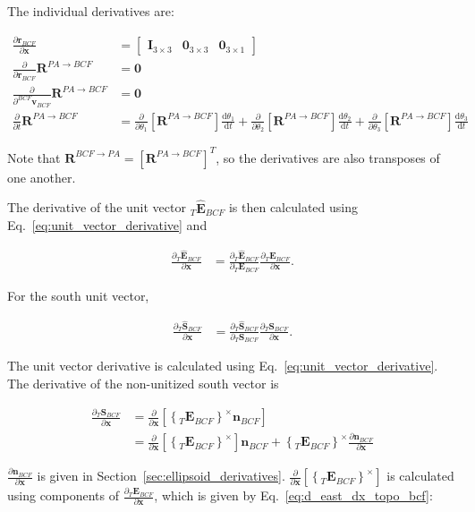 \documentclass[]{article}
\newcommand{\vb}[1]{\bm{#1}} %
\newcommand{\vbh}[1]{\hat{\bm{#1}}} %
\newcommand{\ddt}[1]{\frac{\mathrm{d} #1}{\mathrm{d} t}} %
\newcommand{\pd}[2]{\frac{\partial #1}{\partial #2}} %
\begin{document}
The individual derivatives are:

\begin{align}
	\pd{\vb{r}_{BCF}}{\vb{x}} &= \left[ \begin{array}{ccc} \vb{I}_{3 \times 3} & \vb{0}_{3 \times 3} & \vb{0}_{3 \times 1} \end{array} \right] \\
	\pd{}{\vb{r}_{BCF}} \vb{R}^{PA \rightarrow BCF} &= \vb{0} \\
	\pd{}{^{BCF} \vb{v}_{BCF}} \vb{R}^{PA \rightarrow BCF} &= \vb{0} \\
	\pd{}{t} \vb{R}^{PA \rightarrow BCF} &= \pd{}{\theta_1} \left[ \vb{R}^{PA \rightarrow BCF} \right] \ddt{\theta_1} + \pd{}{\theta_2} \left[ \vb{R}^{PA \rightarrow BCF} \right] \ddt{\theta_2} + \pd{}{\theta_3} \left[ \vb{R}^{PA \rightarrow BCF} \right] \ddt{\theta_3}
\end{align}

Note that $\vb{R}^{BCF \rightarrow PA} = \left[ \vb{R}^{PA \rightarrow BCF} \right]^T$, so the derivatives are also transposes of one another.

The derivative of the unit vector $_T \vbh{E}_{BCF}$ is then calculated using Eq.~\eqref{eq:unit_vector_derivative} and

\begin{align}
\pd{_T \vbh{E}_{BCF}}{\vb{x}} &= \pd{_T \vbh{E}_{BCF}}{_T \vb{E}_{BCF}} \pd{_T \vb{E}_{BCF}}{\vb{x}}.
\end{align}

For the south unit vector,

\begin{align}
	\pd{_T \vbh{S}_{BCF}}{\vb{x}} &= \pd{_T \vbh{S}_{BCF}}{_T \vb{S}_{BCF}} \pd{_T \vb{S}_{BCF}}{\vb{x}}.
\end{align}

The unit vector derivative is calculated using Eq.~\eqref{eq:unit_vector_derivative}. The derivative of the non-unitized south vector is

\begin{align}
	\pd{_T \vb{S}_{BCF}}{\vb{x}} &= \pd{}{\vb{x}} \left[ \left\{ _T \vb{E}_{BCF} \right\}^{\times} \vb{n}_{BCF} \right] \\
	&= \pd{}{\vb{x}} \left[ \left\{ _T \vb{E}_{BCF} \right\}^{\times} \right] \vb{n}_{BCF} + \left\{ _T \vb{E}_{BCF} \right\}^{\times} \pd{\vb{n}_{BCF}}{\vb{x}}
\end{align}

$\pd{\vb{n}_{BCF}}{\vb{x}}$ is given in Section~\ref{sec:ellipsoid_derivatives}. $\pd{}{\vb{x}} \left[ \left\{ _T \vb{E}_{BCF} \right\}^{\times} \right]$ is calculated using components of $\pd{_T \vb{E}_{BCF}}{\vb{x}}$, which is given by Eq.~\eqref{eq:d_east_dx_topo_bcf}:
\end{document}
